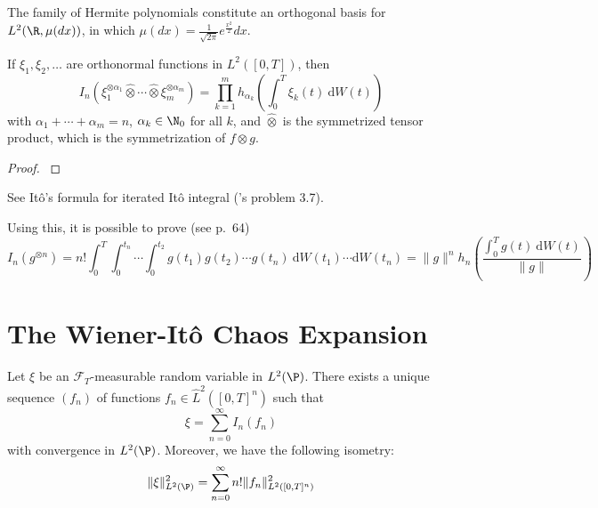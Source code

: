 The family of Hermite polynomials constitute an orthogonal basis for $L^2(\R, \mu(dx))$, in which $\mu(dx) = \frac{1}{\sqrt{2 \pi}} e^{\frac{x^2}{2}} dx$.

\begin{proposition}\label{prop:202311031501}
    If \(\xi_1, \xi_2, \ldots\) are orthonormal
    functions in \(L^2([0,T])\), then \[
    I_n(\xi_1^{\otimes \alpha_1} \hat{\otimes} \cdots \hat{\otimes} \xi_m^{\otimes \alpha_m}) = \prod_{k=1}^m h_{\alpha_k} \left( \int_0^T \xi_k(t) ~\mathrm{d}W(t) \right)
    \] with \(\alpha_1 + \cdots +\alpha_m = n\),
    \(\alpha_k \in \N_0\) for all \(k\), and \(\hat{\otimes}\) is
    the symmetrized tensor product, which is the symmetrization of
    \(f \otimes g\).
\end{proposition}

\begin{proof}
    \cite{ito1951multiple}
\end{proof}

See Itô's formula for iterated Itô integral
(\cite{oksendal2013stochastic}'s problem 3.7).

Using this, it is possible to prove (see
\cite{nualart2018introduction} p.~64) \[
I_n(g^{\otimes n}) = n! \int_0^T \int_0^{t_n} \cdots \int_0^{t_2} g(t_1) g(t_2) \cdots g(t_n) ~\mathrm{d}W(t_1) \cdots \mathrm{d}W(t_n) = \| g \|^n h_n \left( \frac{\int_0^T g(t) ~\mathrm{d}W(t)}{\| g \|} \right)
\]

\section{The Wiener-Itô Chaos Expansion}

\begin{theorem}\label{thm:chaos-expansion}
    Let $\xi$ be an $\mathcal{F}_T$-measurable random variable in $L^2(\P)$. There exists a unique sequence $(f_n)$ of functions $f_n \in \hat{L}^2([0,T]^n)$ such that
    $$
    \xi = \sum_{n=0}^\infty I_n(f_n)
    $$
    with convergence in $L^2(\P)$. Moreover, we have the following isometry:
    $$
    \| \xi \|_{L^2(\P)}^2 = \sum_{n=0}^\infty n! \| f_n \|_{L^2([0,T]^n)}^2
    $$
\end{theorem}

